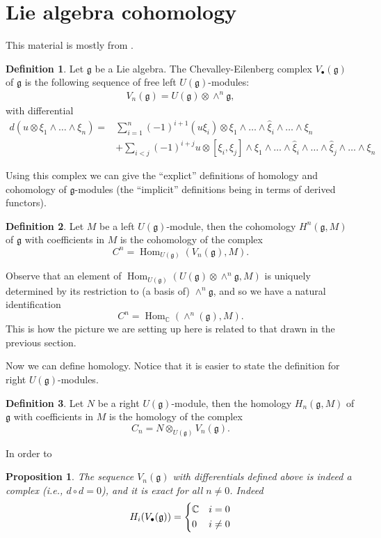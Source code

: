 \documentclass[12pt]{article}
\theoremstyle{plain}
\newtheorem{prop}[thm]{Proposition}
\theoremstyle{definition}
\newtheorem{defn}{Definition}[section]
\numberwithin{equation}{section}
\DeclareMathOperator{\Hom}{Hom}
\newcommand{\what}[1]{\widehat{#1}}
\newcommand{\C}{\mathbb{C}}
\newcommand{\g}{\mathfrak{g}}
\begin{document}
\section{Lie algebra cohomology}


This material is mostly from {\cite[Section 7.7]{Weibel}}.
\begin{defn}
Let $\g$ be a Lie algebra. The Chevalley-Eilenberg complex $V_\bullet(\g)$ of $\g$ is the following sequence of free left $U(\g)$-modules:
\begin{align*}
V_n(\g) = U(\g) \otimes \wedge^n\g,
\end{align*}
with differential
\begin{align*}
d(u \otimes \xi_1 \wedge \ldots \wedge \xi_n) = {} & \sum_{i=1}^{n} (-1)^{i+1} (u \xi_i) \otimes \xi_1 \wedge \ldots \wedge \what\xi_i \wedge \ldots \wedge \xi_n \\
&+ \sum_{i < j} (-1)^{i+j} u \otimes [\xi_i, \xi_j] \wedge \xi_1 \wedge \ldots \wedge \what\xi_i \wedge \ldots \wedge \what\xi_j \wedge \ldots \wedge \xi_n
\end{align*}
\end{defn}

Using this complex we can give the ``explict'' definitions of homology and cohomology of $\g$-modules (the ``implicit'' definitions being in terms of derived functors).
\begin{defn}
Let $M$ be a left $U(\g)$-module, then the cohomology $H^n(\g, M)$ of $\g$ with coefficients in $M$ is the cohomology of the complex
\[
C^n = \Hom_{U(\g)}(V_n(\g), M).
\]
\end{defn}
Observe that an element of $\Hom_{U(\g)}(U(\g) \otimes \wedge^n\g, M)$ is uniquely determined by its restriction to (a basis of) $\wedge^n\g$, and so we have a natural identification
\[
C^n = \Hom_{\C}(\wedge^n(\g), M).
\]
This is how the picture we are setting up here is related to that drawn in the previous section.

Now we can define homology. Notice that it is easier to state the definition for right $U(\g)$-modules.
\begin{defn}
Let $N$ be a right $U(\g)$-module, then the homology $H_n(\g, M)$ of $\g$ with coefficients in $M$ is the homology of the complex
\[
C_n = N \otimes_{U(\g)} V_n(\g).
\]
\end{defn}

In order to
\begin{prop}\label{prop:CE.exact}
The sequence $V_n(\g)$ with differentials defined above is indeed a complex (i.e., $d \circ d = 0$), and it is exact for all $n \neq 0$. Indeed
\begin{align*}
H_i(V_\bullet(\g)) = \begin{dcases}
\C & i=0 \\
0 & i \neq 0
\end{dcases}
\end{align*}
\end{prop}
\end{document}
